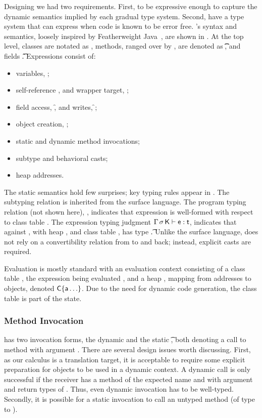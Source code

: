 \documentclass[USenglish]{tex/lipics-v2016}f
\begin{document}
Designing \kafka we had two requirements. First, to be expressive enough to
capture the dynamic semantics implied by each gradual type system. Second,
have a type system that can express when code is known to be error
free. \kafka's syntax and semantics, loosely inspired by Featherweight
Java~\cite{FJ}, are shown in .  At the top level, classes
are notated as \Class{}, methods, ranged over by \md,
are denoted as \Mdef\m\x\t\t\e, and fields \Fdef\f\t. Expressions consist
of:

\vspace{-3mm}

\begin{itemize}
\item variables, \x;
\item self-reference \this, and wrapper target, \that;
\item field access, \FRead\f, and writes, \FWrite\f\e;
\item object creation, \New{};
\item static and dynamic method invocations;
\item subtype and behavioral casts;
\item heap addresses.
\end{itemize}

\noindent
The static semantics hold few surprises; key typing rules appear in
. The subtyping relation is inherited from the surface
language.  The program typing relation (not shown here), \WFp\e\K, indicates
that expression \e is well-formed with respect to class table \K. The
expression typing judgment $\EnvType \Env\s\K\e\t$, indicates that against
\Env, with heap \s, and class table \K, \e has type \t.  Unlike the surface
language, \kafka does not rely on a convertibility relation from \any to \C
and back; instead, explicit casts are required.

Evaluation is mostly standard with an evaluation context consisting of a
class table \K, the expression being evaluated \e, and a heap \s, mapping
from addresses \a to objects, denoted $\C\{\a\ldots\}$. Due to the need for
dynamic code generation, the class table is part of the state.

\subsubsection{Method Invocation}

\kafka has two invocation forms, the dynamic \DynCall\e\m\ep and the static
\KCall\e\m\ep\t\tp, both denoting a call to method \m with argument \ep.
There are several design issues worth discussing.  First, as our calculus is
a translation target, it is acceptable to require some explicit preparation
for objects to be used in a dynamic context.  A dynamic call is only
successful if the receiver has a method of the expected name and with argument
and return types of \any. Thus, even dynamic invocation has to be
well-typed. Secondly, it is possible for a static invocation to call an
untyped method (of type \any to \any).  
\end{document}

